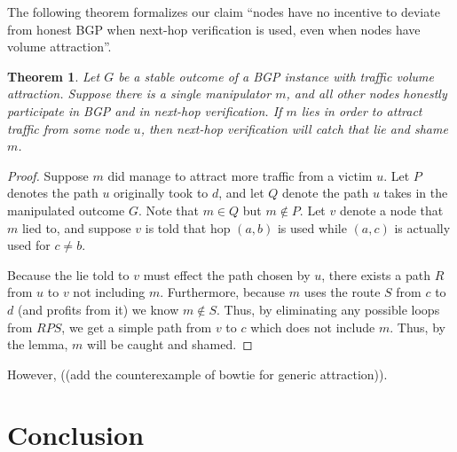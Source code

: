 \documentclass[10pt]{article}
\newtheorem{theorem}{Theorem}
\begin{document}
  The following theorem formalizes our claim ``nodes have no incentive
  to deviate from honest BGP when next-hop verification is used,
  even when nodes have volume attraction''.
  \begin{theorem}
    Let $G$ be a stable outcome of a BGP instance with traffic volume attraction.
    Suppose there is a single manipulator $m$,
    and all other nodes honestly participate in BGP and in next-hop verification.
    If $m$ lies in order to attract traffic from some node $u$,
    then next-hop verification will catch that lie and shame $m$.
  \end{theorem}
  \begin{proof}
    Suppose $m$ did manage to attract more traffic from a victim $u$.
    Let $P$ denotes the path $u$ originally took to $d$,
    and let $Q$ denote the path $u$ takes in the manipulated outcome $G$.
    Note that $m\in Q$ but $m\notin P$.
    Let $v$ denote a node that $m$ lied to, and suppose $v$ is told
    that hop $(a,b)$ is used while $(a,c)$ is actually used for $c\ne b$.

    Because the lie told to $v$ must effect the path chosen by $u$,
    there exists a path $R$ from $u$ to $v$ not including $m$.
    Furthermore, because $m$ uses the route $S$ from $c$ to $d$
    (and profits from it) we know $m\notin S$.
    Thus, by eliminating any possible loops from $RPS$,
    we get a simple path from $v$ to $c$ which does not include $m$.
    Thus, by the lemma, $m$ will be caught and shamed.
  \end{proof}

  However, ((add the counterexample of bowtie for generic attraction)).

\section{Conclusion}
\begin{comment}
Still need to decide what we should put here.
\end{comment}

{}


\clearpage
\end{document}
